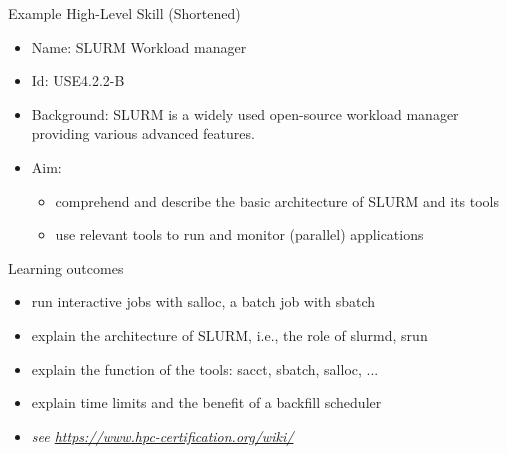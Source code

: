 \documentclass[compress,aspectratio=169]{beamer}
\begin{document}
\begin{frame}{Example High-Level Skill (Shortened)}
\begin{itemize}
\item Name: SLURM Workload manager
\item Id: USE4.2.2-B
\item Background: {\small SLURM is a widely used open-source workload
manager providing various advanced features.}
\item Aim:
\begin{itemize}
\item comprehend and describe the basic architecture of SLURM and its tools
\item use relevant tools to run and monitor (parallel) applications
\end{itemize}
\end{itemize}

\begin{block}{Learning outcomes}
\begin{itemize}
\item run interactive jobs with salloc, a batch job with sbatch
\item explain the architecture of SLURM, i.e., the role of slurmd, srun
\item explain the function of the tools: sacct, sbatch, salloc, ...
\item explain time limits and the benefit of a backfill scheduler
\item \textit{see \url{https://www.hpc-certification.org/wiki/}}
\end{itemize}
\end{block}
\end{frame}
\end{document}
